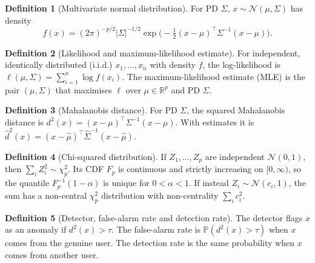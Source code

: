\documentclass[11pt]{article}
\newcommand{\R}{\mathbb{R}}
\renewcommand{\Pr}{\mathbb{P}}
\newcommand{\T}{^{\top}}
\newcommand{\hSigma}{\hat{\Sigma}}
\newcommand{\hmu}{\hat{\mu}}
\theoremstyle{plain}
\theoremstyle{definition}
\newtheorem{definition}{Definition}
\theoremstyle{remark}
\begin{document}
\begin{definition}[Multivariate normal distribution]
For PD $\Sigma$, $x\sim\mathcal N(\mu,\Sigma)$ has density
\[
f(x)=(2\pi)^{-p/2}|\Sigma|^{-1/2}\exp\!\Big(-\tfrac12(x-\mu)\T\Sigma^{-1}(x-\mu)\Big).
\]
\end{definition}

\begin{definition}[Likelihood and maximum-likelihood estimate]
For independent, identically distributed (i.i.d.) $x_1,\dots,x_n$ with density
$f$, the log-likelihood is $\ell(\mu,\Sigma)=\sum_{i=1}^n\log f(x_i)$. The
maximum-likelihood estimate (MLE) is the pair $(\mu,\Sigma)$ that maximises $\ell$
over $\mu\in\R^p$ and PD $\Sigma$.
\end{definition}

\begin{definition}[Mahalanobis distance]
For PD $\Sigma$, the squared Mahalanobis distance is
$d^2(x)=(x-\mu)\T\Sigma^{-1}(x-\mu)$. With estimates it is
$\hat d^2(x)=(x-\hmu)\T\hSigma^{-1}(x-\hmu)$.
\end{definition}

\begin{definition}[Chi-squared distribution]
If $Z_1,\dots,Z_p$ are independent $\mathcal N(0,1)$, then $\sum_iZ_i^2\sim\chi^2_p$.
Its CDF $F_p$ is continuous and strictly increasing on $[0,\infty)$, so the quantile
$F_p^{-1}(1-\alpha)$ is unique for $0<\alpha<1$. If instead $Z_i\sim\mathcal N(c_i,1)$,
the sum has a non-central $\chi^2_p$ distribution with non-centrality $\sum_ic_i^2$.
\end{definition}

\begin{definition}[Detector, false-alarm rate and detection rate]
The detector flags $x$ as an anomaly if $d^2(x)>\tau$. The false-alarm rate is
$\Pr(d^2(x)>\tau)$ when $x$ comes from the genuine user. The detection rate is the
same probability when $x$ comes from another user.
\end{definition}
\end{document}
